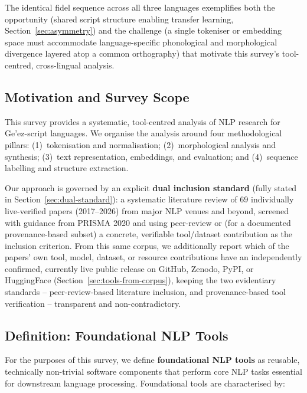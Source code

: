 \documentclass[sn-mathphys-num]{sn-jnl}
\theoremstyle{thmstyleone}
\theoremstyle{thmstyletwo}
\theoremstyle{thmstylethree}
\begin{document}
\noindent The identical fidel sequence across all three languages exemplifies both the opportunity (shared script structure enabling transfer learning, Section~\ref{sec:asymmetry}) and the challenge (a single tokeniser or embedding space must accommodate language-specific phonological and morphological divergence layered atop a common orthography) that motivate this survey's tool-centred, cross-lingual analysis.

\subsection{Motivation and Survey Scope}

This survey provides a systematic, tool-centred analysis of NLP research for Ge'ez-script languages. We organise the analysis around four methodological pillars: (1)~tokenisation and normalisation; (2)~morphological analysis and synthesis; (3)~text representation, embeddings, and evaluation; and (4)~sequence labelling and structure extraction.

Our approach is governed by an explicit \textbf{dual inclusion standard} (fully stated in Section~\ref{sec:dual-standard}): a systematic literature review of 69 individually live-verified papers (2017--2026) from major NLP venues and beyond, screened with guidance from PRISMA 2020 and using peer-review or (for a documented provenance-based subset) a concrete, verifiable tool/dataset contribution as the inclusion criterion. From this same corpus, we additionally report which of the papers' own tool, model, dataset, or resource contributions have an independently confirmed, currently live public release on GitHub, Zenodo, PyPI, or HuggingFace (Section~\ref{sec:tools-from-corpus}), keeping the two evidentiary standards -- peer-review-based literature inclusion, and provenance-based tool verification -- transparent and non-contradictory.

\subsection{Definition: Foundational NLP Tools}

For the purposes of this survey, we define \textbf{foundational NLP tools} as reusable, technically non-trivial software components that perform core NLP tasks essential for downstream language processing. Foundational tools are characterised by:
\end{document}
